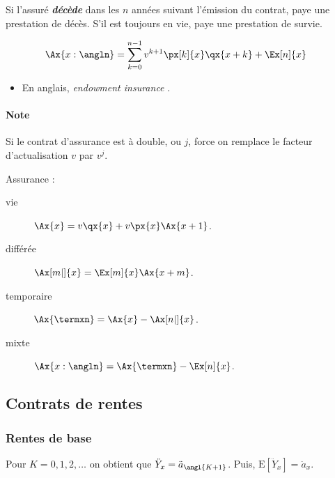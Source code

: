 \documentclass[10pt, french]{article}
\begin{document}
\begin{multicols*}{2}
\begin{definitionNOHFILLsub}
Si l'assuré \textbf{\textit{décède}} dans les $n$ années suivant l'émission du contrat, paye une prestation de décès. S'il est toujours en vie, paye une prestation de survie.

\begin{align*}
	\Ax{x:\angln}
	&=	\sum_{k = 0}^{n - 1} v^{k + 1} \px[k]{x} \qx{x + k} + \Ex[n]{x}
\end{align*}

\begin{itemize}
	\item	En anglais, \og \textit{endowment insurance} \fg{}.
\end{itemize}
\end{definitionNOHFILLsub}

\paragraph{Note}	Si le contrat d'assurance est à double, ou $j$, force on remplace le facteur d'actualisation $v$ par $v^{j}$.


\begin{definitionNOHFILLprop}
Assurance :
\begin{description}
	\item[vie]	$\Ax{x} = v\qx{x} + v\px{x}\Ax{x + 1}$.
	\item[différée]	$\Ax[m|]{x} = \Ex[m]{x} \Ax{x + m}$.
	\item[temporaire]	$\Ax{\termxn} = \Ax{x} - \Ax[n|]{x}$.
	\item[mixte]	$\Ax{x:\angln} = \Ax{\termxn} - \Ex[n]{x}$.
\end{description}
\end{definitionNOHFILLprop}



\columnbreak
\subsection{Contrats de rentes}
\subsubsection{Rentes de base}
\begin{definitionNOHFILLsub}
Pour $K = 0, 1, 2,\dots$ on obtient que $\ddot{Y}_{x} = \ddot{a}_{\angl{K + 1}}$. Puis, $\text{E}[\ddot{Y}_{x}] = \ddot{a}_{x}$.


\end{definitionNOHFILLsub}
\end{multicols*}
\end{document}
